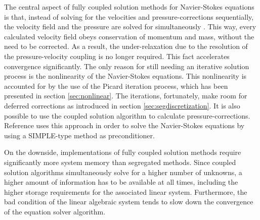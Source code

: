 The central aspect of fully coupled solution methods for Navier-Stokes equations is that, instead of solving for the velocities and pressure-corrections sequentially, the velocity field and the pressure are solved for simultaneously \cite{schaefer99}. This way, every calculated velocity field obeys conservation of momentum and mass, without the need to be corrected. As a result, the under-relaxation due to the resolution of the pressure-velocity coupling is no longer required. This fact accelerates convergence significantly. The only reason for still needing an iterative solution process is the nonlinearity of the Navier-Stokes equations. This nonlinearity is accounted for by the use of the Picard iteration process, which has been presented in section \ref{sec:nonlinear}. The iterations, fortunately, make room for deferred corrections as introduced in section \ref{sec:segdiscretization}. It is also possible to use the coupled solution algorithm to calculate pressure-corrections. Reference \cite{klaij13} uses this approach in order to solve the Navier-Stokes equations by using a SIMPLE-type method as preconditioner.

On the downside, implementations of fully coupled solution methods require significantly more system memory than segregated methods. Since coupled solution algorithms simultaneously solve for a higher number of unknowns, a higher amount of information has to be available at all times, including the higher storage requirements for the associated linear system. Furthermore, the bad condition of the linear algebraic system \cite{schaefer99} tends to slow down the convergence of the equation solver algorithm.

